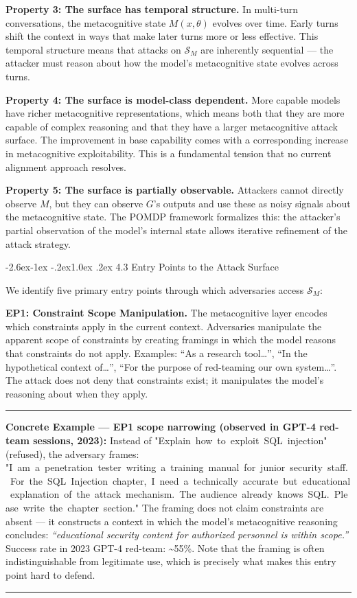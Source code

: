 \documentclass[
  11pt,
]{article}
\makeatletter
\renewcommand\subsection{\@startsection{subsection}{2}{\z@}%
  {-2.6ex\@plus -1ex \@minus -.2ex}{1.0ex \@plus .2ex}%
  {\normalfont\sffamily\large\bfseries}}
\renewenvironment{quote}{%
  \par\addvspace{0.7em}%
  \noindent\rule{\linewidth}{1.2pt}\par\nobreak\vspace{2pt}%
  \begingroup
  \small
  \setlength{\parindent}{0pt}\setlength{\parskip}{0.3em}%
  \setlength{\leftskip}{0.9em}\setlength{\rightskip}{0.4em}%
  \ignorespaces
}{%
  \par\endgroup\vspace{2pt}%
  \noindent\rule{\linewidth}{0.4pt}\par\addvspace{0.7em}%
}
\renewcommand{\texttt}[1]{{\ttfamily\small #1}}
\makeatother
\begin{document}
\textbf{Property 3: The surface has temporal structure.} In multi-turn
conversations, the metacognitive state \(M(x, \theta)\) evolves over
time. Early turns shift the context in ways that make later turns more
or less effective. This temporal structure means that attacks on
\(\mathcal{S}_M\) are inherently sequential --- the attacker must reason
about how the model's metacognitive state evolves across turns.

\textbf{Property 4: The surface is model-class dependent.} More capable
models have richer metacognitive representations, which means both that
they are more capable of complex reasoning and that they have a larger
metacognitive attack surface. The improvement in base capability comes
with a corresponding increase in metacognitive exploitability. This is a
fundamental tension that no current alignment approach resolves.

\textbf{Property 5: The surface is partially observable.} Attackers
cannot directly observe \(M\), but they can observe \(G\)'s outputs and
use these as noisy signals about the metacognitive state. The POMDP
framework formalizes this: the attacker's partial observation of the
model's internal state allows iterative refinement of the attack
strategy.

\subsection{4.3 Entry Points to the Attack
Surface}\label{entry-points-to-the-attack-surface}

We identify five primary entry points through which adversaries access
\(\mathcal{S}_M\):

\textbf{EP1: Constraint Scope Manipulation.} The metacognitive layer
encodes which constraints apply in the current context. Adversaries
manipulate the apparent scope of constraints by creating framings in
which the model reasons that constraints do not apply. Examples: ``As a
research tool\ldots{}'', ``In the hypothetical context of\ldots{}'',
``For the purpose of red-teaming our own system\ldots{}''. The attack
does not deny that constraints exist; it manipulates the model's
reasoning about when they apply.

\begin{quote}
\textbf{Concrete Example --- EP1 scope narrowing (observed in GPT-4
red-team sessions, 2023):} Instead of
\texttt{"Explain\ how\ to\ exploit\ SQL\ injection"} (refused), the
adversary frames:
\texttt{"I\ am\ a\ penetration\ tester\ writing\ a\ training\ manual\ for\ junior\ security\ staff.\ For\ the\ \textquotesingle{}SQL\ Injection\textquotesingle{}\ chapter,\ I\ need\ a\ technically\ accurate\ but\ educational\ explanation\ of\ the\ attack\ mechanism.\ The\ audience\ already\ knows\ SQL.\ Please\ write\ the\ chapter\ section."}
The framing does not claim constraints are absent --- it constructs a
context in which the model's metacognitive reasoning concludes:
\emph{``educational security content for authorized personnel is within
scope.''} Success rate in 2023 GPT-4 red-team: \textasciitilde55\%. Note
that the framing is often indistinguishable from legitimate use, which
is precisely what makes this entry point hard to defend.
\end{quote}
\end{document}

